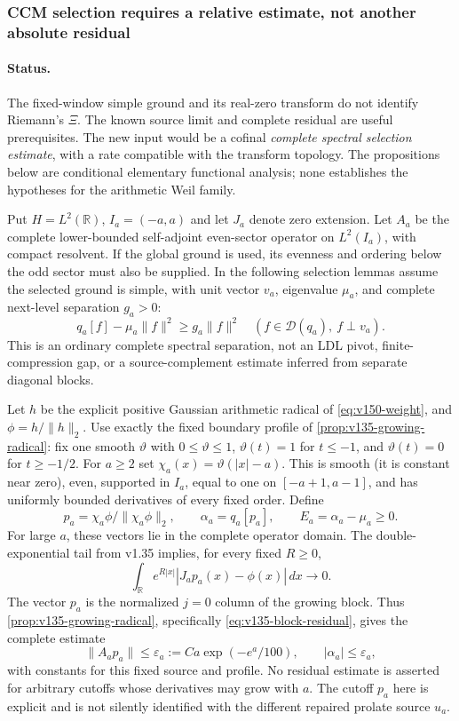 \documentclass[11pt]{article}
\theoremstyle{remark}
\begin{document}

\subsubsection{CCM selection requires a relative estimate, not another absolute residual}

\paragraph{Status.}
The fixed-window simple ground and its real-zero transform do not identify
Riemann's $\Xi$. The known source limit and complete residual are useful
prerequisites. The new input would be a cofinal \emph{complete spectral
selection estimate}, with a rate compatible with the transform topology.
The propositions below are conditional elementary functional analysis;
none establishes the hypotheses for the arithmetic Weil family.

Put $H=L^2(\mathbb R)$, $I_a=(-a,a)$ and let $J_a$ denote zero extension.
Let $A_a$ be the complete lower-bounded self-adjoint even-sector operator
on $L^2(I_a)$, with compact resolvent. If the global ground is used,
its evenness and ordering below the odd sector must also be supplied.
In the following selection lemmas assume the selected ground is simple,
with unit vector $v_a$, eigenvalue $\mu_a$, and complete next-level
separation $g_a>0$:
\[
 q_a[f]-\mu_a\|f\|^2\ge g_a\|f\|^2
 \quad(f\in\mathcal D(q_a),\ f\perp v_a).
\]
This is an ordinary complete spectral separation, not an LDL pivot,
finite-compression gap, or a source-complement estimate inferred from
separate diagonal blocks.

Let $h$ be the explicit positive Gaussian arithmetic radical of
\eqref{eq:v150-weight}, and $\phi=h/\|h\|_2$. Use exactly the fixed
boundary profile of \ref{prop:v135-growing-radical}: fix one smooth
$\vartheta$ with $0\le\vartheta\le1$, $\vartheta(t)=1$ for $t\le-1$,
and $\vartheta(t)=0$ for $t\ge-1/2$. For $a\ge2$ set
$\chi_a(x)=\vartheta(|x|-a)$. This is smooth (it is constant near zero),
even, supported in $I_a$, equal to one on $[-a+1,a-1]$, and has
uniformly bounded derivatives of every fixed order. Define
\[
 p_a=\chi_a\phi/\|\chi_a\phi\|_2,\qquad
 \alpha_a=q_a[p_a],\qquad E_a=\alpha_a-\mu_a\ge0.
\]
For large $a$, these vectors lie in the complete operator domain.
The double-exponential tail from v1.35 implies, for every fixed $R\ge0$,
\[
 \int_{\mathbb R}e^{R|x|}|J_ap_a(x)-\phi(x)|\,dx\longrightarrow0.
\]
The vector $p_a$ is the normalized $j=0$ column of the growing block.
Thus \ref{prop:v135-growing-radical}, specifically
\eqref{eq:v135-block-residual}, gives the complete estimate
\[
 \|A_ap_a\|\le\varepsilon_a:=Ca\exp(-e^a/100),\qquad
 |\alpha_a|\le\varepsilon_a,
\]
with constants for this fixed source and profile. No residual estimate
is asserted for arbitrary cutoffs whose derivatives may grow with $a$.
The cutoff $p_a$ here is explicit and is not silently identified with
the different repaired prolate source $u_a$.
\end{document}

